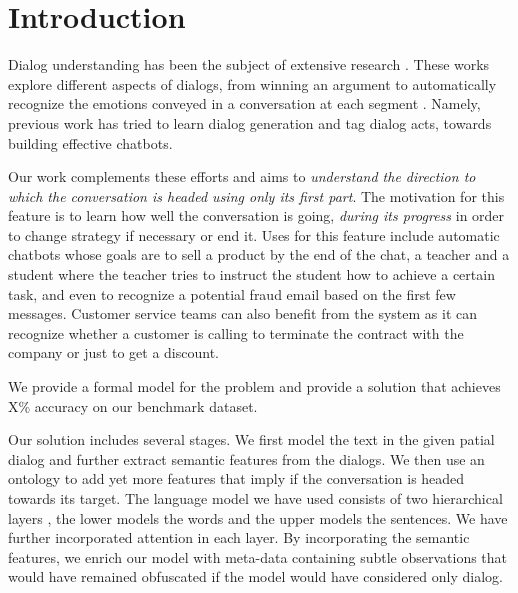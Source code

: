 \section{Introduction}\label{sec:into}
Dialog understanding has been the subject of 
extensive research \cite{BohusR03,BordesW16,GhazvininejadBC17,ShawarA03,DBLP:conf/icassp/JiB05,DBLP:conf/coling/WermterL96}. 
These works explore different aspects of dialogs, from winning an argument \cite{TanNDL16} 
to automatically recognize the emotions conveyed in a conversation at each segment \cite{AyadiKK11}. 
Namely, previous work \cite{ShawarA03,Jia09,ShawarA08,AngLS05,SurendranL06} has tried to learn dialog 
generation and tag dialog acts, towards building effective chatbots. 

Our work complements these efforts and aims to {\em understand the 
direction to which the conversation is headed using only its 
first part}. The motivation for this feature is to learn how 
well the conversation is going, {\em during its progress} in order 
to change strategy if necessary or end it. 
Uses for this feature include automatic chatbots whose goals 
are to sell a product by the end of the chat, a teacher and a student 
where the teacher tries to instruct the student how to achieve a certain task, 
and even to recognize a potential fraud email based on the first few 
messages.
Customer service teams can also benefit from the system as it can recognize 
whether a customer is calling to terminate the contract with the company 
or just to get a discount. 

We provide a formal model for the problem and provide a solution 
that achieves X\%  accuracy on our benchmark dataset. 

Our solution includes several stages. 
We first model the text in the given patial dialog and further extract semantic features from the dialogs. 
We then use an ontology to add yet more features that imply if the conversation 
is headed towards its target. 
The language model we have used consists of two hierarchical layers \cite{attention}, the lower 
models the words and the upper models the sentences. We have further 
incorporated attention \cite{BahdanauCB14} in each layer. 
By incorporating the semantic features, 
we enrich our model with meta-data containing subtle observations 
that would have remained obfuscated if the model would have considered only dialog. 


